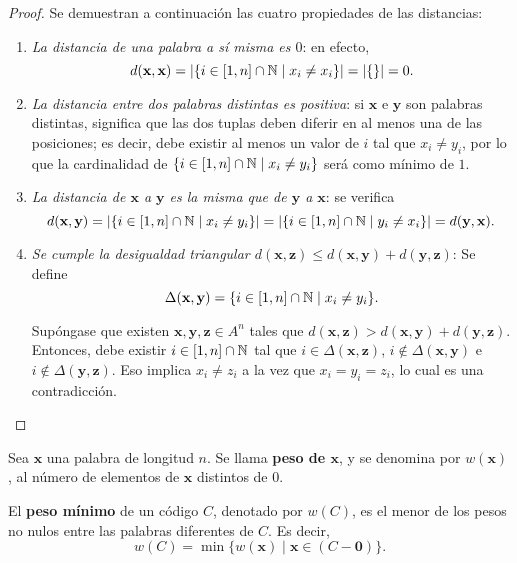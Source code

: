 \begin{proof}
	Se demuestran a continuación las cuatro propiedades de las distancias:
	\begin{enumerate}
		\item \textit{La distancia de una palabra a sí misma es $0$}: en efecto,
		\[d(\textbf{x}, \textbf{x}) = |\{i\in[1,n]\cap\mathbb{N} \mid x_i \neq x_i\}| = |\{\}| = 0.\]
		\item \textit{La distancia entre dos palabras distintas es positiva}: si $\textbf{x}$ e $\textbf{y}$ son palabras distintas, significa que las dos tuplas deben diferir en al menos una de las posiciones; es decir, debe existir al menos un valor de $i$ tal que $x_i \neq y_i$, por lo que la cardinalidad de $\{i \in [1, n]\cap\mathbb{N} \mid x_i \neq y_i\}$ será como mínimo de $1$.
		\item \textit{La distancia de $\textbf{x}$ a $\textbf{y}$ es la misma que de $\textbf{y}$ a $\textbf{x}$}: se verifica
		\[d(\textbf{x}, \textbf{y}) = |\{i\in[1,n]\cap\mathbb{N} \mid x_i \neq y_i\}| = |\{i\in[1,n]\cap\mathbb{N} \mid y_i \neq x_i\}| = d(\textbf{y}, \textbf{x}).\]
		\item \textit{Se cumple la desigualdad triangular $d(\textbf{x}, \textbf{z}) \leq d(\textbf{x}, \textbf{y}) + d(\textbf{y}, \textbf{z})$}:
		Se define
		\[\Delta(\textbf{x}, \textbf{y}) = \{i\in[1,n]\cap\mathbb{N} \mid x_i \neq y_i\}.\]
		
		Supóngase que existen $\textbf{x}, \textbf{y}, \textbf{z} \in A^n$ tales que $d(\textbf{x}, \textbf{z}) > d(\textbf{x}, \textbf{y}) + d(\textbf{y}, \textbf{z})$. Entonces, debe existir $i \in [1, n]\cap\mathbb{N}$ tal que $i \in \Delta(\textbf{x}, \textbf{z})$, $i \notin \Delta(\textbf{x}, \textbf{y})$ e $i \notin \Delta(\textbf{y}, \textbf{z})$. Eso implica $x_i \neq z_i$ a la vez que $x_i = y_i = z_i$, lo cual es una contradicción.
	\end{enumerate}
\end{proof}

\begin{definition}
	Sea $\textbf{x}$ una palabra de longitud $n$. Se llama \textbf{peso de $\textbf{x}$}, y se denomina por $w(\textbf{x})$, al número de elementos de $\textbf{x}$ distintos de $0$.
\end{definition}

\begin{definition}
	El \textbf{peso mínimo} de un código $C$, denotado por $w(C)$, es el menor de los pesos no nulos entre las palabras diferentes de $C$. Es decir,
	\[w(C) = \min\{w(\textbf{x}) \mid \textbf{x}\in (C - \mathbf{0})\}.\]
\end{definition}

